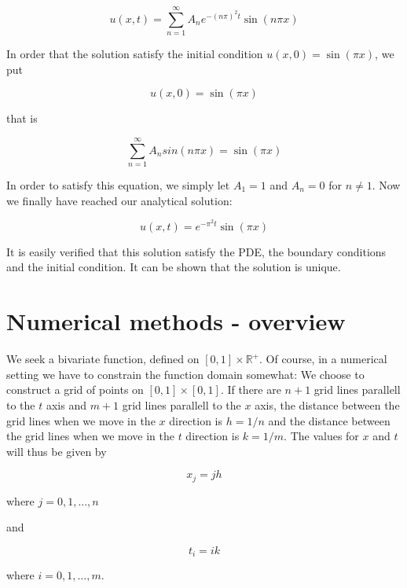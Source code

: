 \documentclass{article}
\begin{document}
\begin{equation}
    u(x, t) = \sum_{n=1}^{\infty}{A_n e^{-(n \pi)^2 t} \sin(n \pi x)}
\end{equation}

In order that the solution satisfy the initial condition $u(x, 0) = \sin(\pi x)$, we put

\begin{equation}
    u(x, 0) = \sin(\pi x)
\end{equation}

that is

\begin{equation}
    \sum_{n=1}^{\infty}{A_n  sin(n \pi x)} = \sin(\pi x)
\end{equation}

In order to satisfy this equation, we simply let $A_1 = 1$ and $A_n = 0$ for $n \neq 1$. Now we finally have reached our analytical solution:

\begin{equation}
    u(x, t) = e^{-\pi^2 t} \sin(\pi x)
\end{equation}

It is easily verified that this solution satisfy the PDE, the boundary conditions and the initial condition. It can be shown that the solution is unique.

\section{Numerical methods - overview}
We seek a bivariate function, defined on $[0, 1] \times \mathbb{R}^+$. Of course, in a numerical setting we have to constrain the function domain somewhat: We choose to construct a grid of points on $[0, 1] \times [0, 1]$. If there are $n + 1$ grid lines parallell to the $t$ axis and $m + 1$ grid lines parallell to the $x$ axis, the distance between the grid lines when we move in the $x$ direction is $h = 1/n$ and the distance between the grid lines when we move in the $t$ direction is $k = 1/m$. The values for $x$ and $t$ will thus be given by

\begin{equation}
    x_j = jh
\end{equation}

where $j = 0, 1, ..., n$

and

\begin{equation}
    t_i = ik
\end{equation}

where $i = 0, 1, ..., m$.
\end{document}

